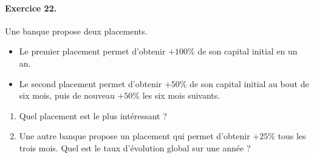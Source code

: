 \documentclass[11pt]{article}
\begin{document}
\paragraph{Exercice 22.} Une banque propose deux placements.
\begin{itemize}
  \item Le premier placement permet d'obtenir $+100\%$ de son capital initial en
    un an.
  \item Le second placement permet d'obtenir $+50\%$ de son capital initial au
    bout de six mois, puis de nouveau $+50\%$ les six mois suivants.
\end{itemize}
\begin{enumerate}
  \item Quel placement est le plus intéressant ?
  \item Une autre banque propose un placement qui permet d'obtenir $+25\%$ tous
    les trois mois. Quel est le taux d'évolution global sur une année ?
\end{enumerate}
\end{document}
